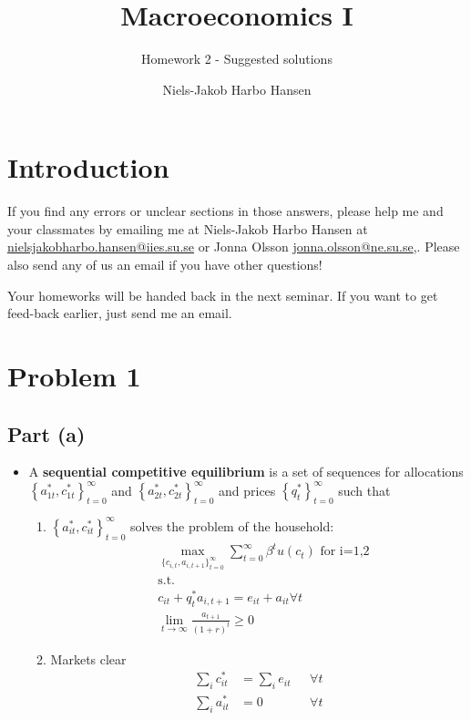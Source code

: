 \documentclass{scrartcl}
\begin{document}
\pagestyle{fancy}
\fancyhead{}
\fancyhead[LE,RO]{\thepage}
\fancyfoot{}

\title{Macroeconomics I}
\subtitle{Homework 2 - Suggested solutions}
\author{Niels-Jakob Harbo Hansen}
\maketitle

\section*{Introduction}
If you find any errors or unclear sections in those answers, please help me and your classmates by emailing me at Niels-Jakob Harbo Hansen at \url{nielsjakobharbo.hansen@iies.su.se} or Jonna Olsson \url{jonna.olsson@ne.su.se},. Please also send any of us an email if you have other questions! 

Your homeworks will be handed back in the next seminar. If you want to get feed-back earlier, just send me an email. 

\section*{Problem 1}

\subsection*{Part (a)}

\begin{itemize}
\item A \textbf{sequential competitive equilibrium} is a set of sequences for allocations $\left\{a_{1t}^*, c_{1t}^*\right\}_{t=0}^{\infty}$ and $\left\{a_{2t}^*, c_{2t}^*\right\}_{t=0}^{\infty}$ and prices $\left\{q_{t}^*\right\}_{t=0}^{\infty}$ such that 
	
	\begin{enumerate}
		\item $\left\{a_{it}^*, c_{it}^*\right\}_{t=0}^{\infty}$ solves the problem of the household:
		\begin{align}
		&\max_{\{{c_{i,t}, a_{i,t+1}}\}_{t=0}^{\infty}} {\sum_{t=0}^{\infty} \beta^t u(c_t)} \text{ for i=1,2}\\
		&\text{s.t. } \nonumber \\ 
		&c_{it}+q_t^* a_{i,t+1}=e_{it}+a_{it} \forall t \nonumber \\
		& \lim_{t \rightarrow \infty} \frac{a_{t+1}}{(1+r)^t} \geq 0 \nonumber 
		\end{align}
		\item Markets clear
		\begin{align}
		\sum_{i} c_{it}^*&=\sum_{i} e_{it} \text{ } &\forall t \\
		\sum_{i} a_{it}^*&=0 \text{ } &\forall t 
		\end{align}
	\end{enumerate}
	
\end{itemize}
\end{document}
